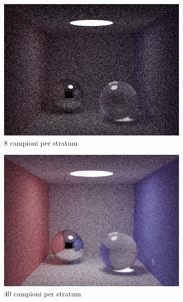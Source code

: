 \begin{figure}[p]
    \begin{subfigure}[c]{0.4\linewidth}
	\centering
	\includegraphics[width=\linewidth]{../assets/appendixD_result_8.png}
	\caption{8 campioni per stratum}
    \end{subfigure}\hspace{12pt}
    \begin{subfigure}[c]{0.4\linewidth}
	\centering
	\includegraphics[width=\linewidth]{../assets/appendixD_result_40.png}
	\caption{40 campioni per stratum}
    \end{subfigure}\hfill
    \begin{subfigure}[c]{0.4\linewidth}

\end{subfigure}
\end{figure}
